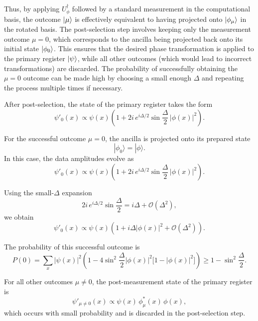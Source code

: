 \documentclass[12pt,a4paper]{article}
\begin{document}
Thus, by applying $U_\phi^\dagger$ followed by a standard measurement in the computational basis, the outcome 
$\ket{\mu}$ is effectively equivalent to having projected onto $\ket{\phi_\mu}$ in the rotated basis.
The post-selection step involves keeping only the measurement outcome $\mu=0$, which corresponds to the ancilla being projected back onto its initial state $\ket{\phi_0}$. This ensures that the desired phase transformation is applied to the primary register $\ket{\psi}$, while all other outcomes (which would lead to incorrect transformations) are discarded. The probability of successfully obtaining the $\mu=0$ outcome can be made high by choosing a small enough $\Delta$ and repeating the process multiple times if necessary.

After post-selection, the state of the primary register takes the form
\begin{equation}
\psi'_0(x) \propto \psi(x) \left( 1 + 2 i \, e^{i \Delta / 2} \sin \frac{\Delta}{2} \, |\phi(x)|^2 \right).
\end{equation}

For the successful outcome $\mu = 0$, the ancilla is projected onto its prepared state
\begin{equation}
|\phi_0\rangle = |\phi\rangle.
\end{equation}
In this case, the data amplitudes evolve as
\begin{equation}
\psi'_0(x) \propto \psi(x) \left( 1 + 2 i \, e^{i \Delta / 2} \sin \frac{\Delta}{2} \, |\phi(x)|^2 \right).
\end{equation}

Using the small-$\Delta$ expansion
\begin{equation}
2 i \, e^{i \Delta / 2} \sin \frac{\Delta}{2} = i \Delta + \mathcal{O}(\Delta^2),
\end{equation}
we obtain
\begin{equation}
\psi'_0(x) \propto \psi(x) \left( 1 + i \Delta |\phi(x)|^2 + \mathcal{O}(\Delta^2) \right).
\end{equation}

The probability of this successful outcome is
\begin{equation}
P(0) = \sum_x |\psi(x)|^2 \left( 1 - 4 \sin^2 \frac{\Delta}{2} |\phi(x)|^2 \big[1 - |\phi(x)|^2 \big] \right) \ge 1 - \sin^2 \frac{\Delta}{2}.
\end{equation}

For all other outcomes $\mu \neq 0$, the post-measurement state of the primary register is
\begin{equation}
\psi'_{\mu \neq 0}(x) \propto \psi(x) \, \phi_\mu^*(x) \, \phi(x),
\end{equation}
which occurs with small probability and is discarded in the post-selection step.
\end{document}
